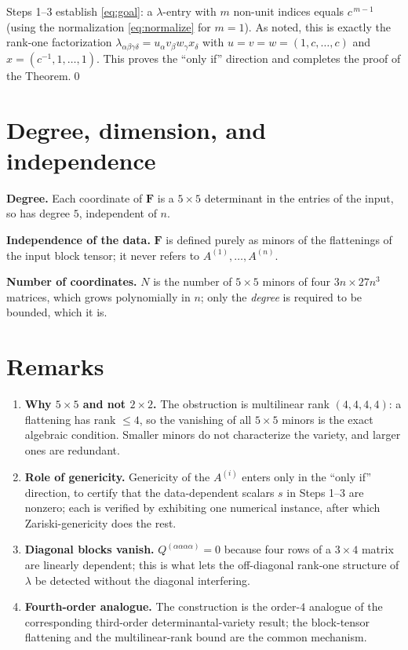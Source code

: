 \documentclass[11pt]{article}
\newcommand{\bF}{\mathbf{F}}
\begin{document}
\medskip
Steps 1–3 establish \eqref{eq:goal}: a $\lambda$-entry with $m$ non-unit indices
equals $c^{\,m-1}$ (using the normalization \eqref{eq:normalize} for $m=1$). As
noted, this is exactly the rank-one factorization
$\lambda_{\alpha\beta\gamma\delta}=u_\alpha v_\beta w_\gamma x_\delta$ with
$u=v=w=(1,c,\dots,c)$ and $x=(c^{-1},1,\dots,1)$. This proves the ``only if''
direction and completes the proof of the Theorem.\qed

\section*{Degree, dimension, and independence}

\textbf{Degree.} Each coordinate of $\bF$ is a $5\times5$ determinant in the
entries of the input, so has degree $5$, independent of $n$. \checkmark

\textbf{Independence of the data.} $\bF$ is defined purely as minors of the
flattenings of the input block tensor; it never refers to $A^{(1)},\dots,A^{(n)}$. \checkmark

\textbf{Number of coordinates.} $N$ is the number of $5\times5$ minors of four
$3n\times27n^{3}$ matrices, which grows polynomially in $n$; only the
\emph{degree} is required to be bounded, which it is. \checkmark

\section*{Remarks}

\begin{enumerate}\setlength\itemsep{4pt}
\item \textbf{Why $5\times5$ and not $2\times2$.} The obstruction is multilinear
rank $(4,4,4,4)$: a flattening has rank $\le4$, so the vanishing of all
$5\times5$ minors is the exact algebraic condition. Smaller minors do not
characterize the variety, and larger ones are redundant.
\item \textbf{Role of genericity.} Genericity of the $A^{(i)}$ enters only in the
``only if'' direction, to certify that the data-dependent scalars $s$ in
Steps 1–3 are nonzero; each is verified by exhibiting one numerical instance,
after which Zariski-genericity does the rest.
\item \textbf{Diagonal blocks vanish.} $Q^{(\alpha\alpha\alpha\alpha)}=0$ because
four rows of a $3\times4$ matrix are linearly dependent; this is what lets the
off-diagonal rank-one structure of $\lambda$ be detected without the diagonal
interfering.
\item \textbf{Fourth-order analogue.} The construction is the order-$4$ analogue
of the corresponding third-order determinantal-variety result; the block-tensor
flattening and the multilinear-rank bound are the common mechanism.
\end{enumerate}
\end{document}
